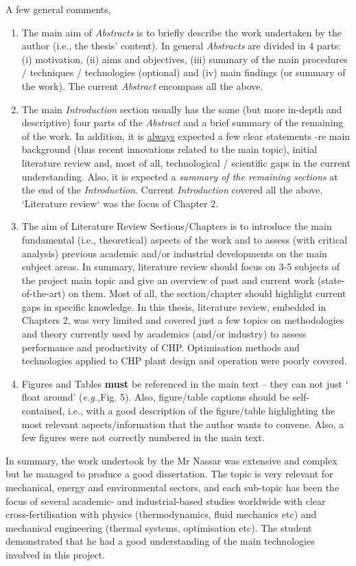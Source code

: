 \documentclass[14pt,twoside]{report}
\newcommand{\eg}{{\it e.g.,}}
\begin{document}
A few general comments,
\begin{enumerate}
%
\item The main aim of {\it Abstracts} is to briefly describe the work undertaken by the author (i.e., the thesis' content). In general {\it Abstracts} are divided in 4 parts: (i) motivation, (ii) aims and objectives, (iii) summary of the main procedures / techniques / technologies (optional) and (iv) main findings (or summary of the work). The current {\it Abstract} encompass all the above.
%
\item The main {\it Introduction} section usually has the same (but more in-depth and descriptive) four parts of the {\it Abstract} and a brief summary of the remaining of the work. In addition, it is \underline{always} expected a few clear statements -re main background (thus recent innovations related to the main topic), initial literature review and, most of all, technological / scientific gaps in the current understanding. Also, it is expected a {\it summary of the remaining sections} at the end of the {\it Introduction}.  Current {\it Introduction} covered all the above. `Literature review` was the focus of Chapter 2.
%
\item The aim of Literature Review Sections/Chapters is to introduce the main fundamental (i.e., theoretical) aspects of the work and to assess (with critical analysis) previous academic and/or industrial developments on the main subject areas. In summary, literature review should focus on 3-5 subjects of the project main topic and give an overview of past and current work (state-of-the-art) on them. Most of all, the section/chapter should highlight current gaps in specific knowledge. In this thesis, literature review, embedded in Chapters 2, was very limited and covered just a few topics on methodologies and theory currently used by academics (and/or industry) to assess performance and productivity of CHP. Optimisation methods and technologies applied to CHP plant design and operation were poorly covered.
%
\item Figures and Tables {\bf must} be referenced in the main text -- they can not just $\lq$float around' (\eg Fig. 5). Also, figure/table captions should be self-contained, i.e., with a good description of the figure/table highlighting the most relevant aspects/information that the author wants to convene. Also, a few figures were not correctly numbered in the main text.
% 
\end{enumerate}
In summary, the work undertook by the Mr Nassar was extensive and complex but he managed to produce a good dissertation. The topic is very relevant for mechanical, energy and environmental sectors, and each sub-topic has been the focus of several academic- and industrial-based studies worldwide with clear cross-fertilisation with physics (thermodynamics, fluid mechanics etc) and mechanical engineering (thermal systems, optimisation etc). The student demonstrated that he had a good understanding of the main technologies involved in this project.
\end{document}
